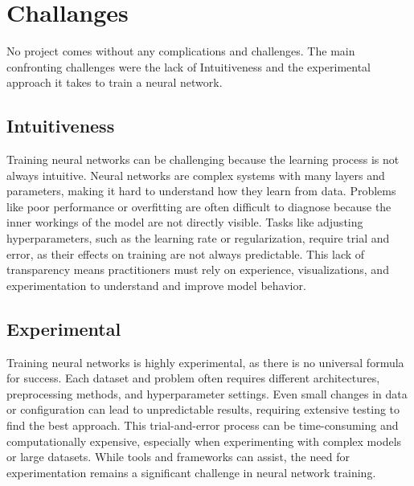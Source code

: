 \section{Challanges}
\label{sec:challanges}
No project comes without any complications and challenges. The main confronting challenges were the lack of Intuitiveness and the experimental approach it takes to train a neural network.

\subsection{Intuitiveness}
Training neural networks can be challenging because the learning process is not always intuitive. Neural networks are complex systems with many layers and parameters, making it hard to understand how they learn from data. Problems like poor performance or overfitting are often difficult to diagnose because the inner workings of the model are not directly visible. Tasks like adjusting hyperparameters, such as the learning rate or regularization, require trial and error, as their effects on training are not always predictable. This lack of transparency means practitioners must rely on experience, visualizations, and experimentation to understand and improve model behavior.

\subsection{Experimental}
Training neural networks is highly experimental, as there is no universal formula for success. Each dataset and problem often requires different architectures, preprocessing methods, and hyperparameter settings. Even small changes in data or configuration can lead to unpredictable results, requiring extensive testing to find the best approach. This trial-and-error process can be time-consuming and computationally expensive, especially when experimenting with complex models or large datasets. While tools and frameworks can assist, the need for experimentation remains a significant challenge in neural network training.